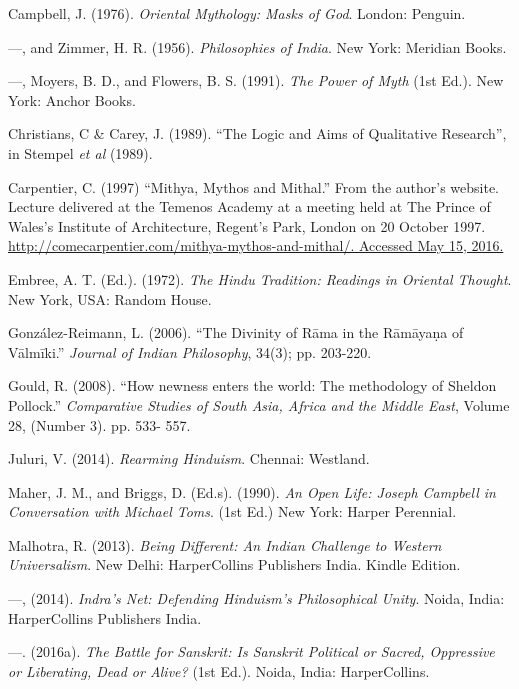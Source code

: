 \begin{thebibliography}{99}
 Campbell, J. (1976). \textit{Oriental Mythology: Masks of God}. London: Penguin.

  —, and Zimmer, H. R. (1956). \textit{Philosophies of India}. New York: Meridian Books.

  —, Moyers, B. D., and Flowers, B. S. (1991). \textit{The Power of Myth} (1st Ed.). New York: Anchor Books.

  Christians, C \& Carey, J. (1989). “The Logic and Aims of Qualitative Research”, in Stempel \textit{et al} (1989).

  Carpentier, C. (1997) “Mithya, Mythos and Mithal.” From the author’s website. Lecture delivered at the Temenos Academy at a meeting held at The Prince of Wales's Institute of Architecture, Regent's Park, London on 20 October 1997. \url{http://comecarpentier.com/mithya-mythos-and-mithal/. Accessed May 15, 2016.}

  Embree, A. T. (Ed.). (1972). \textit{The Hindu Tradition: Readings in Oriental Thought}. New York, USA: Random House.

  González-Reimann, L. (2006). “The Divinity of Rāma in the Rāmāyaṇa of Vālmīki.” \textit{Journal of Indian Philosophy}, 34(3); pp. 203-220.

  Gould, R. (2008). “How newness enters the world: The methodology of Sheldon Pollock.” \textit{Comparative Studies of South Asia, Africa and the Middle East}, Volume 28, (Number 3). pp. 533- 557.

  Juluri, V. (2014). \textit{Rearming Hinduism}. Chennai: Westland.

  Maher, J. M., and Briggs, D. (Ed.s). (1990). \textit{An Open Life: Joseph Campbell in Conversation with Michael Toms}. (1st Ed.) New York: Harper Perennial.

  Malhotra, R. (2013). \textit{Being Different: An Indian Challenge to Western Universalism}. New Delhi: HarperCollins Publishers India. Kindle Edition.

  —, (2014). \textit{Indra’s Net: Defending Hinduism’s Philosophical Unity}. Noida, India: HarperCollins Publishers India.

  —. (2016a). \textit{The Battle for Sanskrit: Is Sanskrit Political or Sacred, Oppressive or Liberating, Dead or Alive?} (1st Ed.). Noida, India: HarperCollins.


\end{thebibliography}
